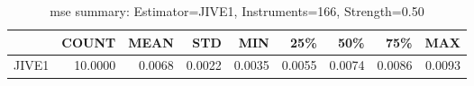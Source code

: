\begin{table}[ht]
\centering
\caption{mse summary: Estimator=JIVE1, Instruments=166, Strength=0.50}
\begin{tabular}{lrrrrrrrr}
\toprule
 & COUNT & MEAN & STD & MIN & 25\% & 50\% & 75\% & MAX \\
\midrule
JIVE1 & 10.0000 & 0.0068 & 0.0022 & 0.0035 & 0.0055 & 0.0074 & 0.0086 & 0.0093 \\
\bottomrule
\end{tabular}
\end{table}
